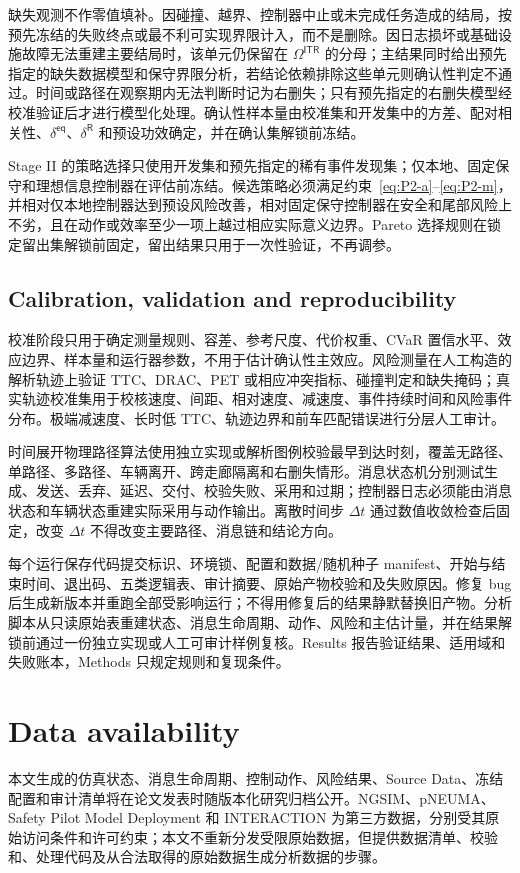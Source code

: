 \documentclass[10pt,a4paper,twocolumn]{article}
\begin{document}
缺失观测不作零值填补。因碰撞、越界、控制器中止或未完成任务造成的结局，按预先冻结的失败终点或最不利可实现界限计入，而不是删除。因日志损坏或基础设施故障无法重建主要结局时，该单元仍保留在 $\Omega^{\mathsf{ITR}}$ 的分母；主结果同时给出预先指定的缺失数据模型和保守界限分析，若结论依赖排除这些单元则确认性判定不通过。时间或路径在观察期内无法判断时记为右删失；只有预先指定的右删失模型经校准验证后才进行模型化处理。确认性样本量由校准集和开发集中的方差、配对相关性、$\delta^{\mathsf{eq}}$、$\delta^{\mathsf R}$ 和预设功效确定，并在确认集解锁前冻结。

Stage II 的策略选择只使用开发集和预先指定的稀有事件发现集；仅本地、固定保守和理想信息控制器在评估前冻结。候选策略必须满足约束~\eqref{eq:P2-a}--\eqref{eq:P2-m}，并相对仅本地控制器达到预设风险改善，相对固定保守控制器在安全和尾部风险上不劣，且在动作或效率至少一项上越过相应实际意义边界。Pareto 选择规则在锁定留出集解锁前固定，留出结果只用于一次性验证，不再调参。

\subsection*{Calibration, validation and reproducibility}
校准阶段只用于确定测量规则、容差、参考尺度、代价权重、CVaR 置信水平、效应边界、样本量和运行器参数，不用于估计确认性主效应。风险测量在人工构造的解析轨迹上验证 TTC、DRAC、PET 或相应冲突指标、碰撞判定和缺失掩码；真实轨迹校准集用于校核速度、间距、相对速度、减速度、事件持续时间和风险事件分布。极端减速度、长时低 TTC、轨迹边界和前车匹配错误进行分层人工审计。

时间展开物理路径算法使用独立实现或解析图例校验最早到达时刻，覆盖无路径、单路径、多路径、车辆离开、跨走廊隔离和右删失情形。消息状态机分别测试生成、发送、丢弃、延迟、交付、校验失败、采用和过期；控制器日志必须能由消息状态和车辆状态重建实际采用与动作输出。离散时间步 $\Delta t$ 通过数值收敛检查后固定，改变 $\Delta t$ 不得改变主要路径、消息链和结论方向。

每个运行保存代码提交标识、环境锁、配置和数据/随机种子 manifest、开始与结束时间、退出码、五类逻辑表、审计摘要、原始产物校验和及失败原因。修复 bug 后生成新版本并重跑全部受影响运行；不得用修复后的结果静默替换旧产物。分析脚本从只读原始表重建状态、消息生命周期、动作、风险和主估计量，并在结果解锁前通过一份独立实现或人工可审计样例复核。Results 报告验证结果、适用域和失败账本，Methods 只规定规则和复现条件。

\section*{Data availability}
本文生成的仿真状态、消息生命周期、控制动作、风险结果、Source Data、冻结配置和审计清单将在论文发表时随版本化研究归档公开。NGSIM、pNEUMA、Safety Pilot Model Deployment 和 INTERACTION 为第三方数据，分别受其原始访问条件和许可约束；本文不重新分发受限原始数据，但提供数据清单、校验和、处理代码及从合法取得的原始数据生成分析数据的步骤。
\end{document}
